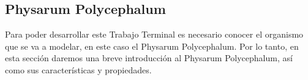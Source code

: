 \subsection{Physarum Polycephalum}
    \label{sec:PhysarumPolycephalum}
    Para poder desarrollar este Trabajo Terminal es necesario conocer el organismo que se va a modelar, 
        en este caso el Physarum Polycephalum. Por lo tanto, en esta secci\'on daremos una breve introducci\'on
        al Physarum Polycephalum, as\'i como sus caracter\'isticas y propiedades.
    \vskip 0.5cm
    
    
    